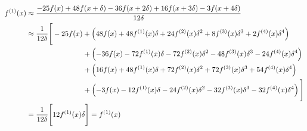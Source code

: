 \documentclass{article}
\begin{document}
\begin{align}
f^{(1)}(x) & \approx \frac{-25 f(x) + 48 f(x+\delta) - 36 f(x+2 \delta) + 16 f(x+3\delta) - 3 f(x+4 \delta)}{12 \delta} \\
& \approx \frac{1}{12 \delta} \Bigg[ -25 f(x) + \left( 48 f(x) + 48 f^{(1)}(x) \delta + 24 f^{(2)}(x) \delta^2 + 8 f^{(3)}(x) \delta^3 + 2 f^{(4)}(x) \delta^4 \right) \nonumber \\
& \hspace{2.75cm} + \left( -36 f(x) - 72 f^{(1)}(x) \delta - 72 f^{(2)}(x) \delta^2 - 48 f^{(3)}(x) \delta^3 - 24 f^{(4)}(x) \delta^4 \right) \nonumber \\
& \hspace{2.75cm} + \left( 16 f(x) + 48 f^{(1)}(x) \delta + 72 f^{(2)}(x) \delta^2 + 72 f^{(3)}(x) \delta^3 + 54 f^{(4)}(x) \delta^4 \right) \nonumber \\
& \hspace{2.75cm} + \left( - 3 f(x) - 12 f^{(1)}(x) \delta - 24 f^{(2)}(x) \delta^2 - 32 f^{(3)}(x) \delta^3 - 32 f^{(4)}(x) \delta^4 \right) \Bigg] \nonumber \\
&= \frac{1}{12 \delta} \Bigg[ 12 f^{(1)}(x) \delta \Bigg] = f^{(1)}(x) \nonumber
\end{align}
\end{document}
